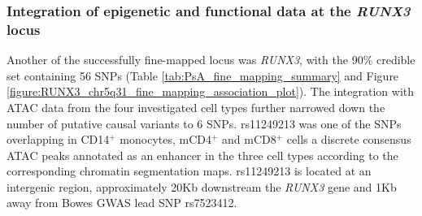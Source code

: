 \subsubsection{Integration of epigenetic and functional data at the \textit{RUNX3} locus}
Another of the successfully fine-mapped locus was \textit{RUNX3}, with the 90\% credible set containing 56 SNPs (Table \ref{tab:PsA_fine_mapping_summary} and Figure \ref{figure:RUNX3_chr5q31_fine_mapping_association_plot}). The integration with ATAC data from the four investigated cell types further narrowed down the number of putative causal variants to 6 SNPs. rs11249213 was one of the SNPs overlapping in CD14$^+$ monocytes, mCD4$^+$ and mCD8$^+$ cells a discrete consensus ATAC peaks annotated as an enhancer in the three cell types according to the corresponding chromatin segmentation maps. rs11249213 is located at an intergenic region, approximately 20Kb downstream the \textit{RUNX3} gene and 1Kb away from Bowes GWAS lead SNP rs7523412.  



